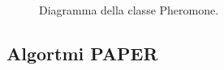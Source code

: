 \begin{figure}[H] 
    \captionsetup{justification=centering, margin=2cm, font=footnotesize}
    \begin{center}
    \end{center}
    \caption[short]{Diagramma della classe Pheromone.}
    \label{classe_pheromone}
\end{figure}

\subsection{Algortmi PAPER}